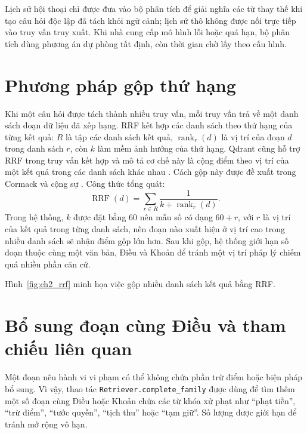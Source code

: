 \documentclass[12pt,a4paper,oneside]{report}
\begin{document}
Lịch sử hội thoại chỉ được đưa vào bộ phân tích để giải nghĩa các từ thay thế khi tạo câu hỏi độc lập đã tách khỏi ngữ cảnh; lịch sử thô không được nối trực tiếp vào truy vấn truy xuất. Khi nhà cung cấp mô hình lỗi hoặc quá hạn, bộ phân tích dùng phương án dự phòng tất định, còn thời gian chờ lấy theo cấu hình.


\section{Phương pháp gộp thứ hạng}
Khi một câu hỏi được tách thành nhiều truy vấn, mỗi truy vấn trả về một danh sách đoạn dữ liệu đã xếp hạng. RRF kết hợp các danh sách theo thứ hạng của từng kết quả: $R$ là tập các danh sách kết quả, $\operatorname{rank}_r(d)$ là vị trí của đoạn $d$ trong danh sách $r$, còn $k$ làm mềm ảnh hưởng của thứ hạng. Qdrant cũng hỗ trợ RRF trong truy vấn kết hợp và mô tả cơ chế này là cộng điểm theo vị trí của một kết quả trong các danh sách khác nhau \cite{qdrant_hybrid_docs}. Cách gộp này được đề xuất trong Cormack và cộng sự \cite{rrf_cormack_2009}. Công thức tổng quát:
\begin{equation}
  \operatorname{RRF}(d)=\sum_{r\in R}\frac{1}{k+\operatorname{rank}_r(d)}.
\end{equation}
Trong hệ thống, $k$ được đặt bằng 60 nên mẫu số có dạng $60+r$, với $r$ là vị trí của kết quả trong từng danh sách, nên đoạn nào xuất hiện ở vị trí cao trong nhiều danh sách sẽ nhận điểm gộp lớn hơn. Sau khi gộp, hệ thống giới hạn số đoạn thuộc cùng một văn bản, Điều và Khoản để tránh một vị trí pháp lý chiếm quá nhiều phần căn cứ.

Hình~\ref{fig:ch2_rrf} minh họa việc gộp nhiều danh sách kết quả bằng RRF.

\section{Bổ sung đoạn cùng Điều và tham chiếu liên quan}
Một đoạn nêu hành vi vi phạm có thể không chứa phần trừ điểm hoặc biện pháp bổ sung. Vì vậy, thao tác \texttt{Retriever.complete\_family} được dùng để tìm thêm một số đoạn cùng Điều hoặc Khoản chứa các từ khóa xử phạt như ``phạt tiền'', ``trừ điểm'', ``tước quyền'', ``tịch thu'' hoặc ``tạm giữ''. Số lượng được giới hạn để tránh mở rộng vô hạn.
\end{document}
